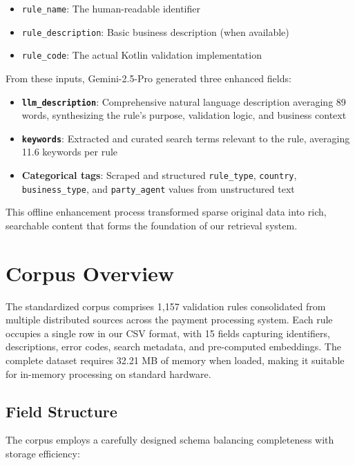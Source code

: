 \begin{itemize}[leftmargin=*,itemsep=2pt,topsep=2pt]
 \item \texttt{rule\_name}: The human-readable identifier
 \item \texttt{rule\_description}: Basic business description (when available)
 \item \texttt{rule\_code}: The actual Kotlin validation implementation
\end{itemize}

From these inputs, Gemini-2.5-Pro generated three enhanced fields:

\begin{itemize}[leftmargin=*,itemsep=2pt,topsep=2pt]
 \item \textbf{\texttt{llm\_description}}: Comprehensive natural language description averaging 89 words, synthesizing the rule's purpose, validation logic, and business context
 \item \textbf{\texttt{keywords}}: Extracted and curated search terms relevant to the rule, averaging 11.6 keywords per rule
 \item \textbf{Categorical tags}: Scraped and structured \texttt{rule\_type}, \texttt{country}, \texttt{business\_type}, and \texttt{party\_agent} values from unstructured text
\end{itemize}

This offline enhancement process transformed sparse original data into rich, searchable content that forms the foundation of our retrieval system.

\section{Corpus Overview}
The standardized corpus comprises 1,157 validation rules consolidated from multiple distributed sources across the payment processing system. Each rule occupies a single row in our CSV format, with 15 fields capturing identifiers, descriptions, error codes, search metadata, and pre-computed embeddings. The complete dataset requires 32.21 MB of memory when loaded, making it suitable for in-memory processing on standard hardware.

\subsection{Field Structure}

The corpus employs a carefully designed schema balancing completeness with storage efficiency:

